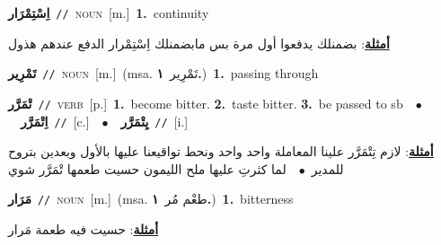 \documentclass[10pt,a4paper,twoside]{article} %
\begin{document}
\begin{multicols}{2}
{\setlength\topsep{0pt}\textbf{\foreignlanguage{arabic}{اِسْتِمْرَار}}\ {\color{gray}\texttt{//}\color{black}}\ \textsc{noun}\ [m.]\ \textbf{1.}~continuity\  \begin{flushright}\color{gray}\foreignlanguage{arabic}{\textbf{\underline{\foreignlanguage{arabic}{أمثلة}}}: بضمنلك يدفعوا أول مرة بس مابضمنلك اِسْتِمْرار الدفع عندهم هذول}\end{flushright}\color{black}} \vspace{2mm}

{\setlength\topsep{0pt}\textbf{\foreignlanguage{arabic}{تَمْرِير}}\ {\color{gray}\texttt{//}\color{black}}\ \textsc{noun}\ [m.]\ \color{gray}(msa. \foreignlanguage{arabic}{تَمْرِير}~\foreignlanguage{arabic}{\textbf{١.}})\color{black}\ \textbf{1.}~passing through\ } \vspace{2mm}

{\setlength\topsep{0pt}\textbf{\foreignlanguage{arabic}{تْمَرَّر}}\ {\color{gray}\texttt{//}\color{black}}\ \textsc{verb}\ [p.]\ \textbf{1.}~become bitter.  \textbf{2.}~taste bitter.  \textbf{3.}~be passed to sb\ \ $\bullet$\ \ \setlength\topsep{0pt}\textbf{\foreignlanguage{arabic}{اِتْمَرَّر}}\ {\color{gray}\texttt{//}\color{black}}\ [c.]\ \ $\bullet$\ \ \setlength\topsep{0pt}\textbf{\foreignlanguage{arabic}{يِتْمَرَّر}}\ {\color{gray}\texttt{//}\color{black}}\ [i.]\  \begin{flushright}\color{gray}\foreignlanguage{arabic}{\textbf{\underline{\foreignlanguage{arabic}{أمثلة}}}: لازم تِتْمَرَّر علينا المعاملة واحد واحد ونحط تواقيعنا عليها بالأول وبعدين بتروح للمدير\ $\bullet$\ \  لما كثرتِ عليها ملح الليمون حسيت طعمها تْمَرَّر شوي}\end{flushright}\color{black}} \vspace{2mm}

{\setlength\topsep{0pt}\textbf{\foreignlanguage{arabic}{مَرَار}}\ {\color{gray}\texttt{//}\color{black}}\ \textsc{noun}\ [m.]\ \color{gray}(msa. \foreignlanguage{arabic}{طعْم مُر}~\foreignlanguage{arabic}{\textbf{١.}})\color{black}\ \textbf{1.}~bitterness\  \begin{flushright}\color{gray}\foreignlanguage{arabic}{\textbf{\underline{\foreignlanguage{arabic}{أمثلة}}}: حسيت فيه طعمة مَرار}\end{flushright}\color{black}} \vspace{2mm}


\end{multicols}
\end{document}
